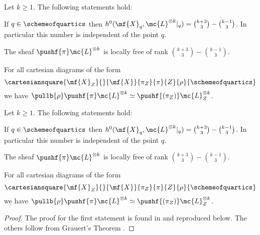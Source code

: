 \begin{proposition} \label{quartics-base-change}
	Let $k\geq 1$. The following statements hold:

	\begin{enumerate}
	\huyitem If $q\in \schemeofquartics$ then
	$h^0 ( \mf{X}_q, \mc{L}^{\otimes k}|_q) = \binom{k+3}{3} - \binom{k-1}{3}$.
	In particular this number is independent of the point $q$.

	\huyitem The sheaf
	$\pushf{\pi}\mc{L}^{\otimes k}$
	is locally free of rank
	$\binom{k+3}{3} - \binom{k-1}{3}$.

	\huyitem For all cartesian diagrams of the form 
	\[
	\cartesiansquare{\mf{X}_{Z}}{}{\mf{X}}{\pi_Z}{\pi}{Z}{\rho}{\schemeofquartics}
	\]
	we have
	$\pullb{\rho}\pushf{\pi}\mc{L}^{\otimes k}
	\simeq
	\pushf{(\pi_Z)}\mc{L}^{\otimes k}_Z$.
	\end{enumerate}
\end{proposition}

\begin{proposition} \label{verlinde-base-change}
	Let $k\geq 1$. The following statements hold:

	\begin{enumerate}
	\huyitem If $q\in \schemeofquartics$ then
	$h^0 ( \mf{X}_q, \mc{L}^{\otimes k}|_q) = \binom{k+3}{3} - \binom{k-1}{3}$.
	In particular this number is independent of the point $q$.

	\huyitem The sheaf
	$\pushf{\pi}\mc{L}^{\otimes k}$
	is locally free of rank
	$\binom{k+3}{3} - \binom{k-1}{3}$.

	\huyitem For all cartesian diagrams of the form 
	\[
	\cartesiansquare{\mf{X}_{Z}}{}{\mf{X}}{\pi_Z}{\pi}{Z}{\rho}{\schemeofquartics}
	\]
	we have
	$\pullb{\rho}\pushf{\pi}\mc{L}^{\otimes k}
	\simeq
	\pushf{(\pi_Z)}\mc{L}^{\otimes k}_Z$.
	\end{enumerate}
\end{proposition}

\begin{proof}
	The proof for the first statement is found in
	\cite[Proposition 4.1]{hemminghaus-verlinde-bundles}
	and reproduced below. The others follow from Grauert's Theorem
	\cite[{}28.1.5]{vakil-algebraic-geometry}.
\end{proof}	

